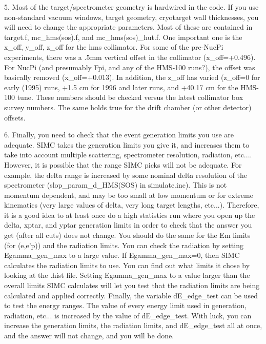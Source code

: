 \smallskip

5. Most of the target/spectrometer geometry is hardwired in the code.
If you use non-standard vacuum windows, target geometry, cryotarget
wall thicknesses, you will need to change the appropriate parameters.
Most of these are contained in target.f, mc\_hms(sos).f, and mc\_hms(sos)\_hut.f.
One important one is the x\_off, y\_off, z\_off for the hms collimator.
For some of the pre-NucPi experiments, there was a .5mm vertical offset in the
collimator (x\_off=+0.496).  For NucPi (and presumably Fpi, and any of the
HMS-100 runs?), the offset was basically removed (x\_off=+0.013).  In
addition, the z\_off has varied (z\_off=0 for early (1995) runs, +1.5 cm
for 1996 and later runs, and +40.17 cm for the HMS-100 tune.  These numbers
should be checked versus the latest collimator box survey numbers.
The same holds true for the drift chamber (or other detector) offsets.

\smallskip

6. Finally, you need to check that the event generation limits you
use are adequate.  SIMC takes the generation limits you give it, and
increases them to take into account multiple scattering, spectrometer
resolution, radiation, etc....  However, it is possible that the range
SIMC picks will not be adequate.  For example, the delta range is increased
by some nominal delta resolution of the spectrometer (slop\_param\_d\_HMS(SOS)
in simulate.inc).  This is not momentum dependent, and may be too small
at low momentum or for extreme kinematics (very large values of delta,
very long target lengths, etc...).  Therefore, it is a good idea to
at least once do a high statistics run where you open up the delta, xptar,
and yptar generation limits in order to check that the answer you get (after
all cuts) does not change.  You should do the same for the Em limits (for
(e,e'p)) and the radiation limits.  You can check the radiation by setting
Egamma\_gen\_max to a large value.  If Egamma\_gen\_max=0, then SIMC calculates
the radiation limits to use.  You can find out what limits it chose by
looking at the .hist file.  Setting Egamma\_gen\_max to a value larger
than the overall limits SIMC calculates will let you test that the radiation
limits are being calculated and applied correctly.  Finally, the variable
dE\_edge\_test can be used to test the energy ranges.  The value of every
energy limit used in generation, radiation, etc... is increased by the
value of dE\_edge\_test.  With luck, you can increase the generation limits,
the radiation limits, and dE\_edge\_test all at once, and the answer will not
change, and you will be done.

